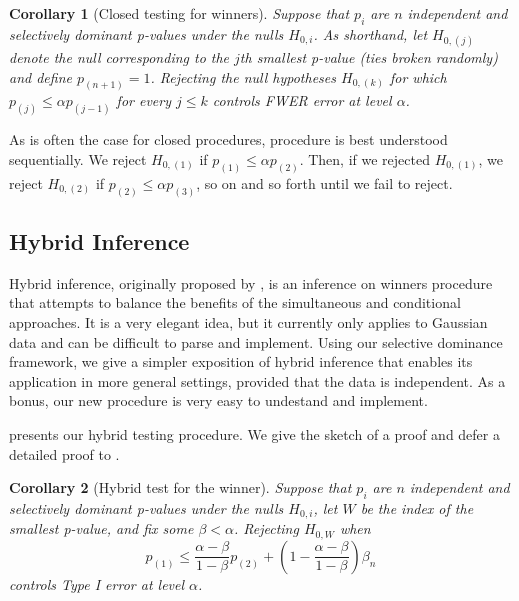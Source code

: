 \documentclass{article}
\newtheorem{corollary}{Corollary}
\begin{document}
\begin{corollary}[Closed testing for winners]
    \label{cor:cond_closed}
    Suppose that $p_i$ are $n$ independent and selectively dominant p-values under the nulls $H_{0, i}$. As shorthand, let $H_{0, (j)}$ denote the null corresponding to the $j$th smallest p-value (ties broken randomly) and define $p_{(n+1)} = 1$.  Rejecting the null hypotheses $H_{0, (k)}$ for which $p_{(j)} \leq \alpha p_{(j-1)} $ for every $j \leq k$ controls FWER error at level $\alpha$. 
\end{corollary}

As is often the case for closed procedures,  procedure is best understood sequentially. We reject $H_{0, (1)}$ if $p_{(1)} \leq \alpha p_{(2)}$. Then, if we rejected  $H_{0, (1)}$, we reject $H_{0, (2)}$ if $p_{(2)} \leq \alpha p_{(3)}$, so on and so forth until we fail to reject. 

\subsection{Hybrid Inference}

Hybrid inference, originally proposed by \cite{Andrews2023}, is an inference on winners procedure that attempts to balance the benefits of the simultaneous and conditional approaches. It is a very elegant idea, but it currently only applies to Gaussian data and can be difficult to parse and implement. Using our selective dominance framework, we give a simpler exposition of hybrid inference that enables its application in more general settings, provided that the data is independent. As a bonus, our new procedure is very easy to undestand and implement.

 presents our hybrid testing procedure. We give the sketch of a proof and defer a detailed proof to . 

\begin{corollary}[Hybrid test for the winner]
    \label{cor:hyb}
    Suppose that $p_i$ are $n$ independent and selectively dominant p-values under the nulls $H_{0, i}$, let $W$ be the index of the smallest p-value, and fix some $\beta < \alpha$. Rejecting $H_{0, W}$ when 
    \begin{equation}
        \label{eq:hybrid_cutoff_thm}
        p_{(1)} \leq \frac{\alpha-\beta}{1-\beta}p_{(2)}  + \left(1 - \frac{\alpha - \beta}{1 - \beta}\right) \beta_n
    \end{equation} 
    controls Type I error at level $\alpha$. 
\end{corollary}
\end{document}
